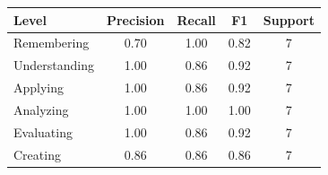 \begin{tabular}{lcccc}
\hline
Level & Precision & Recall & F1 & Support \\
\hline
Remembering & 0.70 & 1.00 & 0.82 & 7 \\
Understanding & 1.00 & 0.86 & 0.92 & 7 \\
Applying & 1.00 & 0.86 & 0.92 & 7 \\
Analyzing & 1.00 & 1.00 & 1.00 & 7 \\
Evaluating & 1.00 & 0.86 & 0.92 & 7 \\
Creating & 0.86 & 0.86 & 0.86 & 7 \\
\hline
\end{tabular}